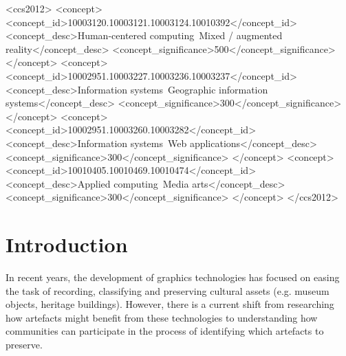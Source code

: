 \documentclass[acmlarge,screen,dvipsnames]{acmart}
\begin{document}
\begin{CCSXML} <ccs2012> <concept>
<concept_id>10003120.10003121.10003124.10010392</concept_id>
<concept_desc>Human-centered computing~Mixed / augmented
reality</concept_desc> <concept_significance>500</concept_significance>
</concept> <concept>
<concept_id>10002951.10003227.10003236.10003237</concept_id>
<concept_desc>Information systems~Geographic information
systems</concept_desc> <concept_significance>300</concept_significance>
</concept> <concept> <concept_id>10002951.10003260.10003282</concept_id>
<concept_desc>Information systems~Web applications</concept_desc>
<concept_significance>300</concept_significance> </concept> <concept>
<concept_id>10010405.10010469.10010474</concept_id> <concept_desc>Applied
computing~Media arts</concept_desc>
<concept_significance>300</concept_significance> </concept> </ccs2012>
\end{CCSXML}

  

\maketitle
\section{Introduction} In recent years, the development of graphics
technologies has focused on easing the task of recording, classifying and
preserving cultural assets (e.g. museum objects, heritage buildings). However,
there is a current shift from researching how artefacts might
benefit from these technologies to understanding how communities can 
participate in the process of identifying which artefacts to preserve. 
\end{document}
